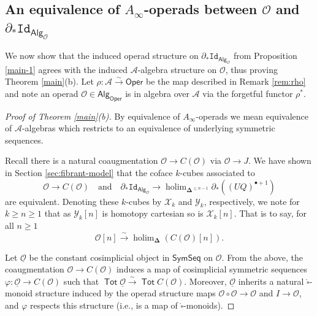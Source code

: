 \documentclass[11pt]{amsart}
\theoremstyle{definition}
\theoremstyle{remark}
\newcommand{\Tot}{\operatorname{\mathsf{Tot}}}
\newcommand{\holim}{\operatorname{holim}}
\newcommand{\Alg}[1]{ {\mathsf{Alg}_{\mathcal{#1}}} }
\newcommand{\SymSeq}{\mathsf{SymSeq}}
\newcommand{\Oper}{\mathsf{Oper}}
\newcommand{\Id}{\mathtt{Id}}
\newcommand{\Cal}[1]{\mathcal{#1}}
\newcommand{\boxcirc}{\mathring{\square}}
\newcommand{\bdel}{\mathbf{\Delta}}
\begin{document}
\subsection{An equivalence of $A_{\infty}$-operads between $\Cal{O}$ and $\partial_* \Id_{\Alg{O}}$} \label{O-and-dern-equiv}
We now show that the induced operad structure on $\partial_* \Id_{\Alg{O}}$ from Proposition \ref{main-1} agrees with the induced $\Cal{A}$-algebra structure on $\Cal{O}$, thus proving Theorem \ref{main}(b). Let $\rho \colon \Cal{A}\xrightarrow{\sim} \Oper$ be the map described in Remark \ref{rem:rho} and note an operad $\Cal{O}\in \Alg{\mathsf{Oper}}$ is in algebra over $\Cal{A}$ via the forgetful functor $\rho^*$.


\begin{proof}[Proof of Theorem \ref{main}(b)]
     By equivalence of $A_{\infty}$-operads we mean equivalence of $\Cal{A}$-algebras which restricts to an equivalence of underlying symmetric sequences. 
     
     Recall there is a natural coaugmentation $\Cal{O}\to C(\Cal{O})$ via $\Cal{O}\to J$. We have shown in Section \ref{sec:fibrant-model} that the coface $k$-cubes associated to \[ \Cal{O}\to C(\Cal{O}) \quad \text{and} \quad \partial_*\Id_{\Alg{O}}\to \holim_{\bdel^{\leq n-1}} \partial_* ( (UQ)^{\bullet+1})\]  are equivalent. Denoting these $k$-cubes by $\Cal{X}_k$ and $\Cal{Y}_k$, respectively, we note for $k\geq n\geq 1$ that as $\Cal{Y}_k[n]$ is homotopy cartesian so is $\Cal{X}_k[n]$. That is to say, for all $n\geq 1$ \begin{equation*}
    \label{On-->der_n}
        \Cal{O}[n] \xrightarrow{\sim} \holim_{\bdel}(  C(\Cal{O})[n]).
    \end{equation*}
    
    Let $\underline{\Cal{O}}$ be the constant cosimplicial object in $\SymSeq$ on $\Cal{O}$. From the above, the coaugmentation $\Cal{O}\to C(\Cal{O})$ induces a map of cosimplicial symmetric sequences $\varphi\colon \underline{\Cal{O}} \to  C(\Cal{O})$ such that  $\Tot \underline{\Cal{O}} \xrightarrow{\sim} \Tot C(\Cal{O})$. Moreover, $\underline{\Cal{O}}$ inherits a natural $\boxcirc$-monoid structure induced by the operad structure maps $\Cal{O}\circ\Cal{O}\to\Cal{O}$ and $I\to \Cal{O}$, and $\varphi$ respects this structure (i.e., is a map of $\boxcirc$-monoids).
    

\end{proof}
\end{document}
